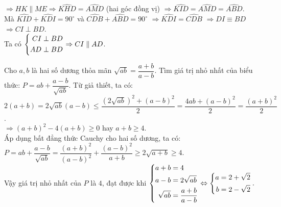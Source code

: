 \begin{ex}
{\begin{enumerate}
            		$\Rightarrow HK \parallel ME \Rightarrow \widehat{KHD}=\widehat{AMD}$ (hai góc đồng vị) $\Rightarrow  \widehat{KID}=\widehat{AMD}=\widehat{ABD}$.\\
            		Mà $\widehat{KID}+\widehat{KDI}=90^\circ$ và $\widehat{CDB}+\widehat{ABD}=90^\circ$ $\Rightarrow \widehat{KDI}=\widehat{CDB}$ $\Rightarrow DI \equiv BD$ $\Rightarrow CI \perp BD$.\\
            		Ta có $\left\{\begin{aligned}CI \perp BD\\ AD \perp BD\end{aligned}\right. \Rightarrow CI \parallel AD$.
     \end{enumerate}       
    }
\end{ex}

\begin{ex}%
   Cho $a,b$ là hai số dương thỏa mãn $\sqrt{ab}=\dfrac{a+b}{a-b}$. Tìm giá trị nhỏ nhất của biểu thức: $P=ab+\dfrac{a- b}{\sqrt{ab}}$.
\loigiai
    {
    Từ giả thiết, ta có: $2(a+b)=2\sqrt{ab}(a-b) \leq \dfrac{\left(2\sqrt{ab}\right)^2+(a-b)^2}{2}=\dfrac{4ab+(a-b)^2}{2}=\dfrac{(a+b)^2}{2}$.\\
    $\Rightarrow (a+b)^2-4(a+b) \geq 0$ hay $a+b \geq 4$.\\
    Áp dụng bất đẳng thức Cauchy  cho hai số dương, ta có:\\
    $P=ab+\dfrac{a - b}{\sqrt{ab}}=\dfrac{(a+b)^2}{(a-b)^2}+\dfrac{(a-b)^2}{a+b} \geq 2\sqrt{a+b} \geq 4$.\\
    Vậy giá trị nhỏ nhất của $P$ là $4$, đạt được khi $\left\{\begin{aligned}a+b&=4\\ a-b&=2\sqrt{ab}\\ \sqrt{ab}&=\dfrac{a+b}{a-b}\end{aligned}\right.\Leftrightarrow \left\{\begin{aligned}a&=2+\sqrt{2}\\b&=2-\sqrt{2}\end{aligned}\right..$
    }
\end{ex}

